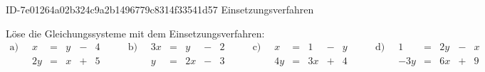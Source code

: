 \begin{exercise}
      {ID-7e01264a02b324c9a2b1496779c8314f33541d57}
      {Einsetzungsverfahren}
  \ifproblem\problem\par
    Löse die Gleichungssysteme mit dem
    Einsetzungsverfahren:
    \begingroup
      \setlength{\arraycolsep}{2pt}
      \begin{equation*}
        \begin{array}{r|rcrcr}
          \text{a)}\;\; &  x & = & y & - & 4 \\
                        & 2y & = & x & + & 5
        \end{array}
        \qquad
        \begin{array}{r|rcrcr}
          \text{b)}\;\; & 3x & = &  y & - & 2 \\
                        &  y & = & 2x & - & 3
        \end{array}
        \qquad
        \begin{array}{r|rcrcr}
          \text{c)}\;\; &  x & = &  1 & - & y \\
                        & 4y & = & 3x & + & 4
        \end{array}
        \qquad
        \begin{array}{r|rcrcr}
          \text{d)}\;\; &   1 & = & 2y & - & x \\
                        & -3y & = & 6x & + & 9
        \end{array}
      \end{equation*}
    \endgroup
  \fi
\end{exercise}
